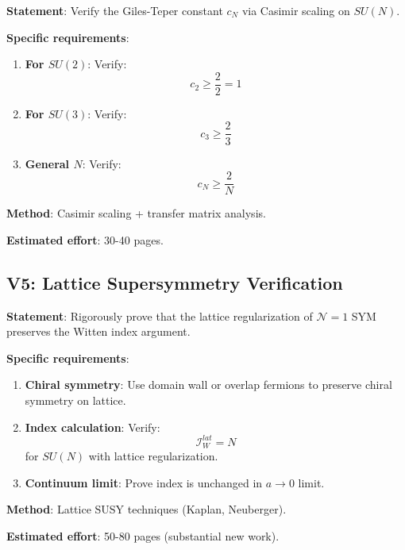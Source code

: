 \begin{verification}
\textbf{Statement}: Verify the Giles-Teper constant $c_N$ via Casimir scaling 
on $SU(N)$.

\textbf{Specific requirements}:
\begin{enumerate}
\item \textbf{For $SU(2)$}: Verify:
\begin{equation}
c_2 \geq \frac{2}{2} = 1
\end{equation}

\item \textbf{For $SU(3)$}: Verify:
\begin{equation}
c_3 \geq \frac{2}{3}
\end{equation}

\item \textbf{General $N$}: Verify:
\begin{equation}
c_N \geq \frac{2}{N}
\end{equation}
\end{enumerate}

\textbf{Method}: Casimir scaling + transfer matrix analysis.

\textbf{Estimated effort}: 30-40 pages.
\end{verification}

\subsection{V5: Lattice Supersymmetry Verification}

\begin{verification}
\textbf{Statement}: Rigorously prove that the lattice regularization of 
$\mathcal{N}=1$ SYM preserves the Witten index argument.

\textbf{Specific requirements}:
\begin{enumerate}
\item \textbf{Chiral symmetry}: Use domain wall or overlap fermions to 
preserve chiral symmetry on lattice.

\item \textbf{Index calculation}: Verify:
\begin{equation}
\mathcal{I}_W^{lat} = N
\end{equation}
for $SU(N)$ with lattice regularization.

\item \textbf{Continuum limit}: Prove index is unchanged in $a \to 0$ limit.
\end{enumerate}

\textbf{Method}: Lattice SUSY techniques (Kaplan, Neuberger).

\textbf{Estimated effort}: 50-80 pages (substantial new work).
\end{verification}

